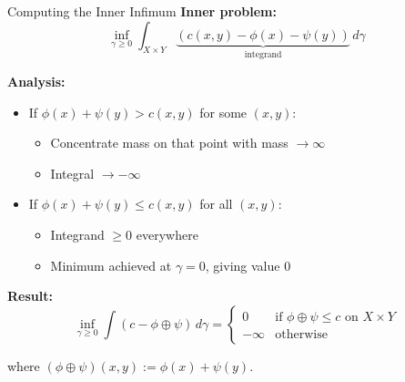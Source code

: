 \documentclass[aspectratio=169]{beamer}
\begin{document}
\begin{frame}{Computing the Inner Infimum}
\textbf{Inner problem:}
\[
\inf_{\gamma \geq 0} \int_{X \times Y} \underbrace{(c(x,y) - \phi(x) - \psi(y))}_{\text{integrand}} \, d\gamma
\]

\vspace{0.3cm}
\textbf{Analysis:}
\begin{itemize}
    \item If $\phi(x) + \psi(y) > c(x,y)$ for some $(x,y)$:
    \begin{itemize}
        \item Concentrate mass on that point with mass $\to \infty$
        \item Integral $\to -\infty$
    \end{itemize}
    \item If $\phi(x) + \psi(y) \leq c(x,y)$ for all $(x,y)$:
    \begin{itemize}
        \item Integrand $\geq 0$ everywhere
        \item Minimum achieved at $\gamma = 0$, giving value $0$
    \end{itemize}
\end{itemize}

\vspace{0.3cm}
\textbf{Result:}
\[
\inf_{\gamma \geq 0} \int (c - \phi \oplus \psi) \, d\gamma =
\begin{cases}
0 & \text{if } \phi \oplus \psi \leq c \text{ on } X \times Y \\
-\infty & \text{otherwise}
\end{cases}
\]

where $(\phi \oplus \psi)(x,y) := \phi(x) + \psi(y)$.
\end{frame}
\end{document}
